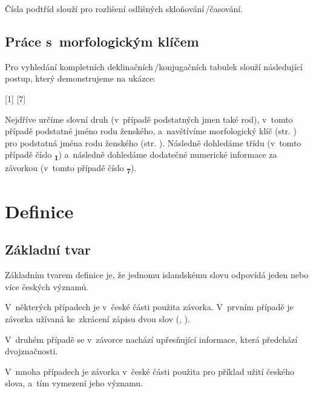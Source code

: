 Čísla podtříd slouží pro rozlišení odlišných skloňování\,/\addthin časování.

\subsection*{Práce s~morfologickým klíčem}

Pro vyhledání kompletních deklinačních\,/\addthin konjugačních tabulek slouží následující postup, který demonstrujeme na ukázce:

\blspace
  \dicEntry {} [1] [7]
\blspace

Nejdříve určíme slovní druh (v~případě podstatných jmen také rod), v~tomto případě podstatné jméno rodu ženského, a~navštívíme morfologický klíč (str. \pageref{sec:morpho}) pro podstatná jména rodu ženského (str. \pageref{sec:morpho_f}).
Následně dohledáme třídu (v~tomto případě číslo {\textsubscript{\textbf{1}}}) a~následně dohledáme dodatečné numerické informace za závorkou (v~tomto případě číslo {\textsubscript{\textbf{7}}}).

\blspace
\tableC
\blspace

\section{Definice}

\subsection*{Základní tvar}

Základním tvarem definice je, že jednomu islandskému slovu odpovídá jeden nebo více českých významů.

\blspace
  \dicEntry {}   
\blspace

V~některých případech je v~české části použita závorka. V~prvním případě je závorka užívaná ke~zkrácení zápisu dvou slov (, ).

\blspace
  \dicEntry {}   
\blspace

V~druhém případě se v~závorce nachází upřesňující informace, která předchází dvojznačnosti.

\blspace
  \dicEntry {}    {\footnotesize {}}
\blspace

V~mnoha případech je závorka v~české části použita pro příklad užití českého slova, a~tím vymezení jeho významu.

